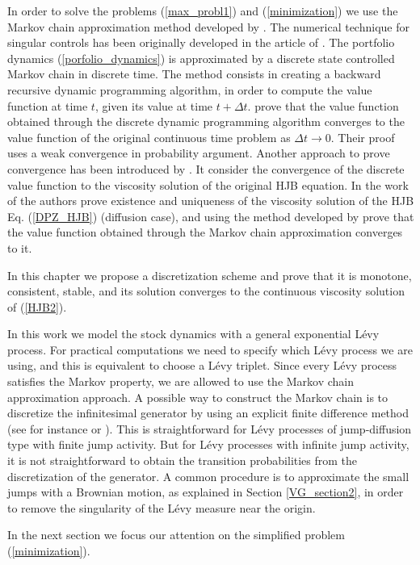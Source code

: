 In order to solve the problems (\ref{max_probl1}) and (\ref{minimization}) we use the Markov chain approximation method developed by \cite{Kushner}.
The numerical technique for singular controls has been originally developed in the article of \cite{MaKu91}.
The portfolio dynamics (\ref{porfolio_dynamics}) is approximated by a discrete state controlled Markov chain in discrete time. 
The method consists in creating a backward recursive 
dynamic programming algorithm, in order to compute the value function at time $t$, given its value at time $t+\Delta t$.
\cite{Kushner} prove that the value function obtained through the discrete dynamic programming algorithm converges to 
the value function of the original continuous time problem as $\Delta t \to 0$. 
Their proof uses a weak convergence in probability argument.
Another approach to prove convergence has been introduced by \cite{BaSo91}. It consider the convergence of the discrete value function to the viscosity solution of the 
original HJB equation.
In the work of \cite{DaPaZa93} the authors prove existence and uniqueness of the viscosity solution
of the HJB Eq. (\ref{DPZ_HJB}) (diffusion case), and using the method developed by \cite{BaSo91} prove 
that the value function obtained through the Markov chain approximation converges to it.

In this chapter we propose a discretization scheme and prove that it is monotone, consistent, stable, and its solution converges to the continuous viscosity
solution of (\ref{HJB2}).

In this work we model the stock dynamics with a general exponential Lévy process. For practical computations we need to specify
which Lévy process we are using, and this is equivalent to choose a Lévy triplet.
Since every L\'evy process satisfies the Markov property, we are allowed to use the Markov chain approximation approach.  
A possible way to construct the Markov chain is to discretize the infinitesimal generator by using an explicit finite difference method
(see for instance \cite{Kushner} or \cite{FlemingSoner}).
This is straightforward for 
Lévy processes of jump-diffusion type with finite jump activity. 
But for Lévy processes with infinite jump activity, it is not straightforward to obtain the transition probabilities from the discretization of the generator.
A common procedure is to approximate the small jumps with a Brownian motion, as explained in Section \ref{VG_section2}, in order to remove
the singularity of the Lévy measure near the origin. 

\noindent
In the next section we focus our attention on the simplified problem (\ref{minimization}). 


